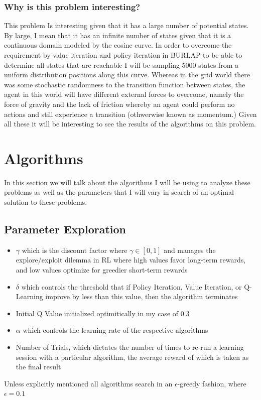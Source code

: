 \documentclass[11pt]{article}
\begin{document}
    \subsubsection{Why is this problem interesting?}
    This problem Is interesting given that it has a large number of potential states.
    By large, I mean that it has an infinite number of states given that it is a continuous domain modeled by the cosine curve.
    In order to overcome the requirement by value iteration and policy iteration in BURLAP to be able to determine all
    states that are reachable I will be sampling 5000 states from a uniform distribution positions along this curve.
    Whereas in the grid world there was some stochastic randomness to the transition function between states, the agent
    in this world will have different external forces to overcome, namely the force of gravity and the lack of friction
    whereby an agent could perform no actions and still experience a transition (othwerwise known as momentum.)
    Given all these it will be interesting to see the results of the algorithms on this problem.


    \section{Algorithms}
    In this section we will talk about the algorithms I will be using to analyze these problems as well as the parameters
    that I will vary in search of an optimal solution to these problems.
    \subsection{Parameter Exploration}
    \begin{itemize}
        \item $\gamma$ which is the discount factor where $\gamma \in [0,1]$ and manages the explore/exploit dilemma in RL where high values favor long-term rewards, and low values optimize for greedier short-term rewards
        \item $\delta$ which controls the threshold that if Policy Iteration, Value Iteration, or Q-Learning improve by less than this value, then the algorithm terminates
        \item Initial Q Value initialized optimitically in my case of 0.3
        \item $\alpha$ which controls the learning rate of the respective algorithms
        \item Number of Trials, which dictates the number of times to re-run a learning session with a particular algorithm, the average reward of which is taken as the final result
    \end{itemize}
    Unless explicitly mentioned all algorithms search in an $\epsilon$-greedy fashion, where $\epsilon = 0.1$
\end{document}
